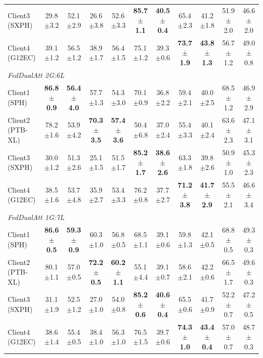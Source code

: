 \documentclass[a4paper]{article}
\begin{document}
\begin{longtable}{l|cc|cc|cc|cc|cc}
  Client3 (SXPH)   & 29.8$\pm$3.2 & 52.1$\pm$2.9 & 26.6$\pm$3.8 & 52.6$\pm$3.3 & \textbf{85.7$\pm$1.1} & \textbf{40.5$\pm$0.4} & 65.4$\pm$2.3 & 41.2$\pm$1.8 & 51.9$\pm$2.0 & 46.6$\pm$2.0 \\
  Client4 (G12EC)  & 39.1$\pm$1.2 & 56.5$\pm$1.2 & 38.9$\pm$1.7 & 56.4$\pm$1.5 & 75.1$\pm$1.2 & 39.3$\pm$0.6 & \textbf{73.7$\pm$1.9} & \textbf{43.8$\pm$1.3} & 56.7$\pm$1.2 & 49.0$\pm$0.8 \\
  \midrule
  \multicolumn{11}{l}{\textit{FedDualAtt 2G:6L}} \\
  \midrule
  Client1 (SPH)    & \textbf{86.8$\pm$0.9} & \textbf{56.4$\pm$4.0} & 57.7$\pm$1.3 & 54.3$\pm$3.0 & 70.1$\pm$0.9 & 36.8$\pm$2.2 & 59.4$\pm$2.1 & 40.0$\pm$2.5 & 68.5$\pm$1.2 & 46.9$\pm$2.9 \\
  Client2 (PTB-XL) & 78.2$\pm$1.6 & 53.9$\pm$4.2 & \textbf{70.3$\pm$3.5} & \textbf{57.4$\pm$3.6} & 50.4$\pm$6.8 & 37.0$\pm$2.4 & 55.4$\pm$3.3 & 40.1$\pm$2.4 & 63.6$\pm$2.3 & 47.1$\pm$3.1 \\
  Client3 (SXPH)   & 30.0$\pm$1.2 & 51.3$\pm$2.6 & 25.1$\pm$1.5 & 51.5$\pm$1.7 & \textbf{85.2$\pm$1.7} & \textbf{38.6$\pm$2.6} & 63.3$\pm$1.8 & 39.8$\pm$2.6 & 50.9$\pm$1.0 & 45.3$\pm$2.3 \\
  Client4 (G12EC)  & 38.5$\pm$1.6 & 53.7$\pm$4.8 & 35.9$\pm$2.7 & 53.4$\pm$3.3 & 76.2$\pm$0.8 & 37.7$\pm$2.7 & \textbf{71.2$\pm$3.8} & \textbf{41.7$\pm$2.9} & 55.5$\pm$2.1 & 46.6$\pm$3.4 \\
  \midrule
  \multicolumn{11}{l}{\textit{FedDualAtt 1G:7L}} \\
  \midrule
  Client1 (SPH)    & \textbf{86.6$\pm$0.5} & \textbf{59.3$\pm$0.9} & 60.3$\pm$1.0 & 56.8$\pm$0.5 & 68.5$\pm$1.1 & 39.1$\pm$0.6 & 59.8$\pm$1.3 & 42.1$\pm$0.5 & 68.8$\pm$0.5 & 49.3$\pm$0.3 \\
  Client2 (PTB-XL) & 80.1$\pm$1.1 & 57.0$\pm$0.5 & \textbf{72.2$\pm$0.5} & \textbf{60.2$\pm$1.1} & 55.1$\pm$4.4 & 39.1$\pm$0.7 & 58.6$\pm$2.1 & 42.2$\pm$0.6 & 66.5$\pm$1.7 & 49.6$\pm$0.3 \\
  Client3 (SXPH)   & 31.1$\pm$1.9 & 52.5$\pm$1.2 & 27.0$\pm$1.0 & 54.0$\pm$0.8 & \textbf{85.2$\pm$0.6} & \textbf{40.6$\pm$0.4} & 65.5$\pm$0.6 & 41.7$\pm$0.9 & 52.2$\pm$0.7 & 47.2$\pm$0.5 \\
  Client4 (G12EC)  & 38.6$\pm$1.4 & 55.4$\pm$0.5 & 38.4$\pm$1.0 & 56.3$\pm$1.0 & 76.5$\pm$1.5 & 39.7$\pm$0.6 & \textbf{74.3$\pm$1.0} & \textbf{43.4$\pm$0.4} & 57.0$\pm$0.7 & 48.7$\pm$0.3 \\
  \midrule

\end{longtable}
\end{document}
